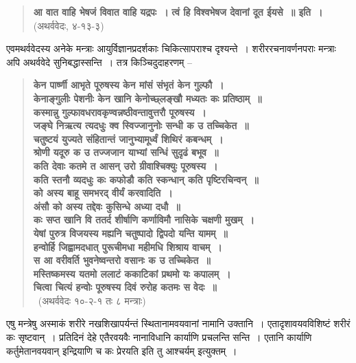 \begin{verse}
\textbf{आ वात वाहि भेषजं विवात वाहि यद्रपः~।}
\textbf{त्वं हि विश्वभेषज देवानां दूत ईयसे~॥ इति~।} (अथर्ववेदः, ४-१३-३)
\end{verse}

एवमथर्ववेदस्य अनेके मन्त्राः आयुर्विज्ञानप्रदर्शकाः चिकित्सापराश्च दृश्यन्ते~। शरीररचनावर्णनपराः मन्त्राः अपि अथर्ववेदे सुनिबद्धास्सन्ति~। तत्र किञ्चिदुदाहरणम् –

\begin{verse}
\textbf{केन पार्ष्णी आभृते पूरुषस्य केन मांसं संभृतं केन गुल्फौ~।}\\
\textbf{केनाङ्गुलीः पेशनीः केन खानि केनोच्छ्लङ्खौ मध्यतः कः प्रतिष्ठाम्~॥}\\
\textbf{कस्मान्नु गुल्फावधरावकृण्वन्नष्ठीवन्तावुत्तरौ पूरुषस्य~।}\\
\textbf{जङ्घे निऋत्य त्यदधुः क्व स्विज्जानुनोः सन्धी क उ तच्चिकेत~॥}\\
\textbf{चतुष्टयं युज्यते संहितान्तं जानुभ्यामूर्ध्वं शिथिरं कबन्धम्~।}\\
\textbf{श्रोणी यदूरु क उ तज्जजान याभ्यां सन्धिं सुदृढं बभूव~॥}\\
\textbf{कति देवाः कतमे त आसन् उरो ग्रीवाश्चिक्युः पूरुषस्य~।}\\
\textbf{कति स्तनौ व्यदधुः कः कफोडौ कति स्कन्धान् कति पृष्टिरचिन्वन्~॥}\\
\textbf{को अस्य बाहू समभरद् वीर्यं करवादिति~।}\\
\textbf{अंसौ को अस्य तद्देवः कुसिन्धे अध्या दधौ~॥}\\
\textbf{कः सप्त खानि वि ततर्द शीर्षाणि कर्णाविमौ नासिके चक्षणी मुखम्~।}\\
\textbf{येषां पुरुत्र विजयस्य मह्यनि चतुष्पादो द्विपदो यन्ति यामम्~॥}\\
\textbf{हन्वोर्हि जिह्वामदधात् पुरूचीमधा महीमधि शिश्राय वाचम्~।}\\
\textbf{स आ वरीवर्ति भुवनेष्वन्तरो वसानः क उ तच्चिकेत~॥}\\
\textbf{मस्तिष्कमस्य यतमो ललाटं ककाटिकां प्रथमो यः कपालम्~।}\\
\textbf{चित्वा चित्यं हन्वोः पूरुषस्य दिवं रुरोह कतमः स वेदः~॥}\\ 
~\hfill(अथर्ववेदः १०-२-१ तः ८ मन्त्राः)
\end{verse}

एषु मन्त्रेषु अस्माकं शरीरे नखशिखापर्यन्तं स्थितानामवयवानां नामानि उक्तानि~। एतादृशावयवविशिष्टं शरीरं कः सृष्टवान्~। प्रतिदिनं देहे एतैरवयवैः नानाविधानि कार्याणि प्रचलन्ति सन्ति~। एतानि कार्याणि कर्तुमेतानवयवान् इन्द्रियाणि च कः प्रेरयति इति तु आश्चर्यम् इत्युक्तम्~।



